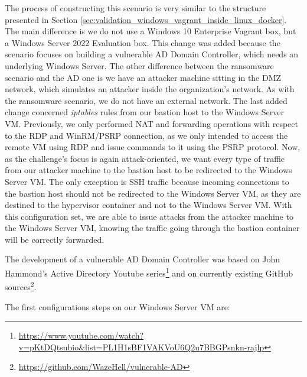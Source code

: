 The process of constructing this scenario is very similar to the structure presented in Section \ref{sec:validation_windows_vagrant_inside_linux_docker}. The main difference is we do not use a Windows 10 Enterprise Vagrant box, but a Windows Server 2022 Evaluation box. This change was added because the scenario focuses on building a vulnerable AD Domain Controller, which needs an underlying Windows Server. The other difference between the ransomware scenario and the AD one is we have an attacker machine sitting in the DMZ network, which simulates an attacker inside the organization's network. As with the ransomware scenario, we do not have an external network. The last added change concerned \textit{iptables} rules from our bastion host to the Windows Server VM. Previously, we only performed NAT and forwarding operations with respect to the RDP and WinRM/PSRP connection, as we only intended to access the remote VM using RDP and issue commands to it using the PSRP protocol. Now, as the challenge's focus is again attack-oriented, we want every type of traffic from our attacker machine to the bastion host to be redirected to the Windows Server VM. The only exception is SSH traffic because incoming connections to the bastion host should not be redirected to the Windows Server VM, as they are destined to the hypervisor container and not to the Windows Server VM. With this configuration set, we are able to issue attacks from the attacker machine to the Windows Server VM, knowing the traffic going through the bastion container will be correctly forwarded.

The development of a vulnerable AD Domain Controller was based on John Hammond's Active Directory Youtube series\footnote{\url{https://www.youtube.com/watch?v=pKtDQtsubio&list=PL1H1sBF1VAKVoU6Q2u7BBGPsnkn-rajlp}} and on currently existing GitHub sources\footnote{\url{https://github.com/WazeHell/vulnerable-AD}}.


The first configurations steps on our Windows Server VM are:

